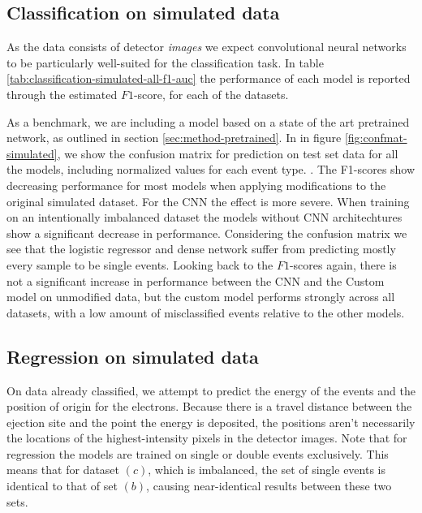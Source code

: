 \subsection{Classification on simulated data}
As the data consists of detector \textit{images} we expect convolutional
neural networks to be particularly well-suited for the classification task.
In table \ref{tab:classification-simulated-all-f1-auc} the performance of each model
is reported through the estimated $F1$-score, for each of the datasets. 

As a benchmark, we are including a model based on a state of the art pretrained 
network\cite{Simonyan2015}, as outlined in section \ref{sec:method-pretrained}. 
In in figure \ref{fig:confmat-simulated}, we show the confusion matrix for prediction
on test set data for all the models, including normalized values for each event type.
. The F1-scores show decreasing
performance for most models when applying modifications to the original simulated dataset.
For the CNN the effect is more severe. When training on an intentionally imbalanced
dataset the models without CNN architechtures show a significant decrease in performance.
Considering the confusion matrix we see that the logistic regressor and dense network
suffer from predicting mostly every sample to be single events. Looking back to the
$F1$-scores again, there is not a significant increase in performance between the
CNN and the Custom model on unmodified data, but the custom model performs strongly
across all datasets, with a low amount of misclassified events relative to the other
models.
 
\subsection{Regression on simulated data}
On data already classified, we attempt to predict the energy of the events and the 
position of origin for the electrons. Because there is a travel distance between the 
ejection site and the point the energy is deposited, the positions aren't necessarily
the locations of the highest-intensity pixels in the detector images.
Note that for regression the models are trained on single or double events exclusively.
This means that for dataset $(c)$, which is imbalanced, the set of single events is
identical to that of set $(b)$, causing near-identical results between these two sets.
